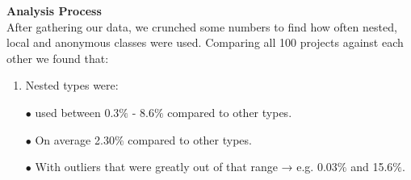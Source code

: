 \documentclass{assignment}
\begin{document}
\textbf{Analysis Process}\\

After gathering our data, we crunched some numbers to find how often nested, local and anonymous classes were used. Comparing all 100 projects against each other we found that:\\
\begin{enumerate}
\item Nested types were:
\item[$\bullet$]used between 0.3$\%$ - 8.6$\%$ compared to other types.
 \item[$\bullet$] On average 2.30$\%$ compared to other types.
 \item[$\bullet$] With outliers that were greatly out of that range → e.g. 0.03$\%$ and 15.6$\%$. \\


\end{enumerate}
\end{document}

